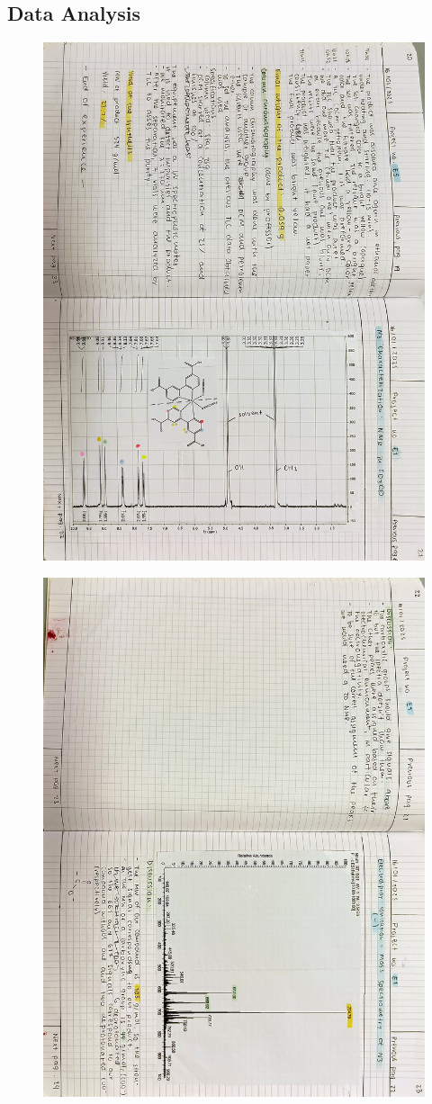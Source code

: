 \subsection{Data Analysis}
\begin{figure}[H]
	\centering
	\includegraphics[width=0.6\linewidth, angle=90]{../images/compressed/IMG20250123173016.jpg}
\end{figure}
\begin{figure}[H]
	\centering
	\includegraphics[width=0.6\linewidth, angle=90]{../images/compressed/IMG20250123173022.jpg}
\end{figure}
